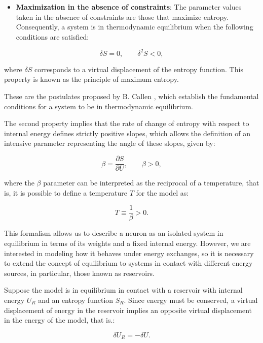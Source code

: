 \documentclass[12pt]{article}
\begin{document}
\begin{itemize}
  \item \textbf{Maximization in the absence of constraints}: The parameter values taken in the absence of constraints are those that maximize entropy. Consequently, a system is in thermodynamic equilibrium when the following conditions are satisfied:
\end{itemize}
\begin{equation}
\delta S = 0, \qquad \delta^2 S < 0,
\end{equation}

where $\delta S$ corresponds to a virtual displacement of the entropy function. This property is known as the principle of maximum entropy.

These are the postulates proposed by B. Callen \cite{callen1985thermodynamics}, which establish the fundamental conditions for a system to be in thermodynamic equilibrium.

The second property implies that the rate of change of entropy with respect to internal energy defines strictly positive slopes, which allows the definition of an intensive parameter representing the angle of these slopes, given by:

\begin{equation}
\beta = \frac{\partial S}{\partial U}, \qquad \beta > 0,
\end{equation}

where the $\beta$ parameter can be interpreted as the reciprocal of a temperature, that is, it is possible to define a temperature $T$ for the model as:

\begin{equation}
T \equiv \frac{1}{\beta} > 0.
\end{equation}

This formalism allows us to describe a neuron as an isolated system in equilibrium in terms of its weights and a fixed internal energy. However, we are interested in modeling how it behaves under energy exchanges, so it is necessary to extend the concept of equilibrium to systems in contact with different energy sources, in particular, those known as reservoirs.

Suppose the model is in equilibrium in contact with a reservoir with internal energy $U_R$ and an entropy function $S_R$. Since energy must be conserved, a virtual displacement of energy in the reservoir implies an opposite virtual displacement in the energy of the model, that is.:

\begin{equation}
\delta U_R = -\delta U.
\end{equation}
\end{document}

